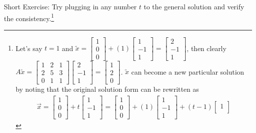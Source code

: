 Short Exercise: Try plugging in any number $t$ to the general solution and verify the consistency.\footnote{\label{footnote:3.3}Let's say $t=1$ and $\tilde{x} = 
\begin{bmatrix}
1 \\
0 \\
0
\end{bmatrix}
+ (1)
\begin{bmatrix}
1 \\
-1 \\
1
\end{bmatrix}
=
\begin{bmatrix}
2 \\
-1 \\
1
\end{bmatrix}$, then clearly $A\tilde{x} = 
\begin{bmatrix}
1 & 2 & 1 \\
2 & 5 & 3 \\
0 & 1 & 1 
\end{bmatrix}
\begin{bmatrix}
2 \\
-1 \\
1
\end{bmatrix}
= 
\begin{bmatrix}
1 \\
2 \\
0
\end{bmatrix}$.\vspace{3pt} $\tilde{x}$ can become a new particular solution by noting that the original solution form can be rewritten as
\begin{align*}
\vec{x} =
\begin{bmatrix}
1 \\
0 \\
0
\end{bmatrix}
+ t
\begin{bmatrix}
1 \\
-1 \\
1
\end{bmatrix}
= 
\begin{bmatrix}
1 \\
0 \\
0
\end{bmatrix}
+ (1)
\begin{bmatrix}
1 \\
-1 \\
1
\end{bmatrix}
+
(t-1)
\begin{bmatrix}
1 \\

\end{bmatrix}
\end{align*}}
